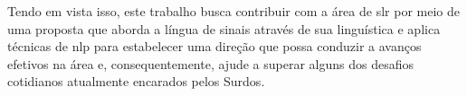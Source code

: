 



Tendo em vista isso, este trabalho busca contribuir com a área de \acrfull{slr} por meio de uma proposta que aborda a língua de sinais através de sua linguística e aplica técnicas de \acrfull{nlp} para estabelecer uma direção que possa conduzir a avanços efetivos na área e, consequentemente, ajude a superar alguns dos desafios cotidianos atualmente encarados pelos Surdos.



